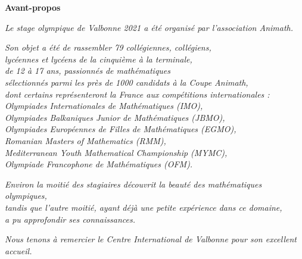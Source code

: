  \pagebreak



\clearpage


\begin{flushright}

\textbf{\Large{Avant-propos}}

\bigskip

\emph{Le stage olympique de Valbonne 2021 a été organisé par l'association Animath.}

\bigskip

\emph{Son objet a été de rassembler 79 collégiennes, collégiens,\\
lycéennes et lycéens de la cinquième à la terminale, \\
de 12 à 17 ans, passionnés de mathématiques \\
sélectionnés parmi les près de 1000 candidats à la Coupe Animath, \\
dont certains représenteront la France aux compétitions internationales : \\
Olympiades Internationales de Mathématiques (IMO), \\
Olympiades Balkaniques Junior de Mathématiques (JBMO), \\
Olympiades Européennes de Filles de Mathématiques (EGMO), \\
Romanian Masters of Mathematics (RMM), \\
Mediterranean Youth Mathematical Championship (MYMC), \\
Olympiade Francophone de Mathématiques (OFM).}

\bigskip

\emph{Environ la moitié des stagiaires découvrit la beauté des mathématiques olympiques, \\
tandis que l'autre moitié, ayant déjà une petite expérience dans ce domaine, \\
a pu approfondir ses connaissances.}

\vspace{3cm}

\emph{Nous tenons à remercier le Centre International de Valbonne pour son excellent accueil.}
\end{flushright}




\pagebreak

\mbox { }

\pagebreak


